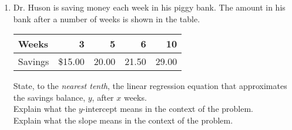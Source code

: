 \documentclass[12pt, oneside]{article}
\begin{document}
\begin{enumerate}
  Solve each equation for $y$.
  \begin{multicols}{2}
    \raggedcolumns
    \begin{enumerate}
      \item $2x+y=5$\\[0.5cm]
    \end{enumerate}
    \begin{enumerate}
      \item $3x-6y=12$ \\[0.5cm]
    \end{enumerate}
  \end{multicols}

  \newpage


\subsubsection*{Fitting linear models and interpreting correlation}
\item Dr. Huson is saving money each week in his piggy bank. The amount in his bank after a number of weeks is shown in the table.
  \renewcommand{\arraystretch}{1.6}
    \begin{center}
      \begin{tabular}{|l|r|r|r|r|}
      \hline
      Weeks & 3 & 5 & 6 & 10\\
      \hline
      Savings  & \$15.00 & 20.00 & 21.50 & 29.00 \\
      \hline
      \end{tabular}
    \end{center}

\begin{center} %
\end{center}
State, to the \emph{nearest tenth}, the linear regression equation that approximates the savings balance, $y$, after $x$ weeks.\\[2cm]
Explain what the $y$-intercept means in the context of the problem. \\[3cm]
Explain what the slope means in the context of the problem.
\newpage

\end{enumerate}
\end{document}
